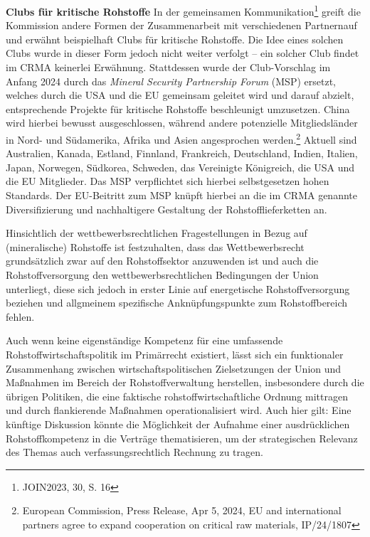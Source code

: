 \documentclass[12pt,a4paper,oneside]{book} %
\begin{document}
\textbf{Clubs für kritische Rohstoffe}
In der gemeinsamen Kommunikation\footnote{JOIN2023, 30, S. 16} greift die Kommission \glqq andere Formen der Zusammenarbeit mit verschiedenen Partnern\grqq auf und erwähnt beispielhaft \glqq Clubs für kritische Rohstoffe\glqq. Die Idee eines solchen Clubs wurde in dieser Form jedoch nicht weiter verfolgt -- ein solcher Club findet im CRMA keinerlei Erwähnung. Stattdessen wurde der Club-Vorschlag im Anfang 2024 durch das \textit{Mineral Security Partnership Forum} (MSP) ersetzt, welches durch die USA und die EU gemeinsam geleitet wird und darauf abzielt, entsprechende Projekte für kritische Rohstoffe beschleunigt umzusetzen. China wird hierbei bewusst ausgeschlossen, während andere potenzielle Mitgliedsländer in Nord- und Südamerika, Afrika und Asien angesprochen werden.\footnote{European Commission, Press Release, Apr 5, 2024, EU and international partners agree to expand cooperation on critical raw materials, IP/24/1807} Aktuell sind Australien, Kanada, Estland, Finnland, Frankreich, Deutschland, Indien, Italien, Japan, Norwegen, Südkorea, Schweden, das Vereinigte Königreich, die USA und die EU Mitglieder.
Das MSP verpflichtet sich hierbei selbstgesetzen hohen Standards.\autocite{US Department of State, Minerals Security Partnership. Principles for Responsible Critical Mineral Supply Chains}
Der EU-Beitritt zum MSP knüpft hierbei an die im CRMA genannte Diversifizierung und nachhaltigere Gestaltung der Rohstofflieferketten an.
	
Hinsichtlich der wettbewerbsrechtlichen Fragestellungen in Bezug auf (mineralische) Rohstoffe ist festzuhalten, dass das Wettbewerbsrecht grundsätzlich zwar auf den Rohstoffsektor anzuwenden ist und auch die Rohstoffversorgung den wettbewerbsrechtlichen Bedingungen der Union unterliegt, diese sich jedoch in erster Linie auf energetische Rohstoffversorgung beziehen und allgmeinem spezifische Anknüpfungspunkte zum Rohstoffbereich fehlen.\autocite{Frau 2025, S. 392ff.}

Auch wenn keine eigenständige Kompetenz für eine umfassende Rohstoffwirtschaftspolitik im Primärrecht existiert, lässt sich ein funktionaler Zusammenhang zwischen wirtschaftspolitischen Zielsetzungen der Union und Maßnahmen im Bereich der Rohstoffverwaltung herstellen, insbesondere durch die übrigen Politiken, die eine faktische rohstoffwirtschaftliche Ordnung mittragen und durch flankierende Maßnahmen operationalisiert wird. Auch hier gilt: Eine künftige Diskussion könnte die Möglichkeit der Aufnahme einer ausdrücklichen Rohstoffkompetenz in die Verträge thematisieren, um der strategischen Relevanz des Themas auch verfassungsrechtlich Rechnung zu tragen.
	
\end{document}
